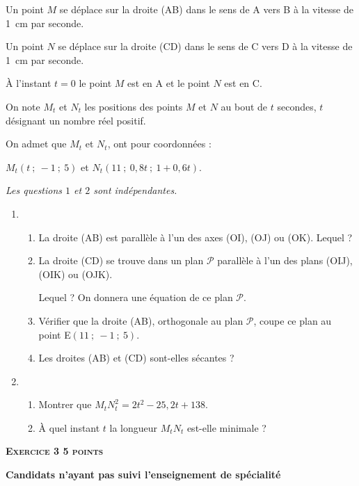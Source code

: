 \documentclass[10pt]{article}
\begin{document}
\medskip

Un point $M$ se déplace sur la droite (AB) dans le sens de A vers B à la vitesse de 1~cm par seconde.

Un point $N$ se déplace sur la droite (CD) dans le sens de C vers D à la vitesse de 1~cm par seconde.

À l'instant $t = 0$ le point $M$ est en A et le point $N$ est en C.

On note $M_t$ et $N_t$ les positions des points $M$ et $N$ au bout de $t$ secondes, $t$ désignant un nombre réel positif.

On admet que $M_t$ et $N_t$, ont pour coordonnées : 

$M_t(t~;~-1~;~5)$ et  $N_t(11~;~0,8t~;~1 + 0,6 t)$.

\medskip

\emph{Les questions $1$ et $2$ sont indépendantes.}

\medskip

\begin{enumerate}
\item 
	\begin{enumerate}
		\item La droite (AB) est parallèle à l'un des axes (OI), (OJ) ou (OK). Lequel ?
		\item La droite (CD) se trouve dans un plan $\mathcal{P}$ parallèle à l'un des plans (OIJ), (OIK) ou (OJK).
		
Lequel ? On donnera une équation de ce plan $\mathcal{P}$.
		\item Vérifier que la droite (AB), orthogonale au plan $\mathcal{P}$, coupe ce plan au point E$(11~;~-1~;~5)$.
		\item Les droites (AB) et (CD) sont-elles sécantes ?
	\end{enumerate}
\item
	\begin{enumerate}
		\item Montrer que $M_t^{}N_t ^2 = 2 t^2 - 25,2 t + 138$.
		\item À quel instant $t$ la longueur $M_tN_t$ est-elle minimale ?
	\end{enumerate}
\end{enumerate}

\vspace{0,5cm}

\textbf{\textsc{Exercice 3 \hfill 5 points}}

\textbf{Candidats n'ayant pas suivi l'enseignement de spécialité} 

\medskip
\end{document}
